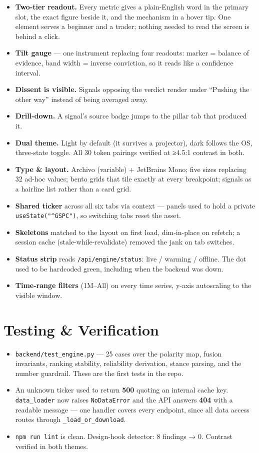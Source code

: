 \documentclass[11pt]{article}
\newcommand{\tk}[1]{\texttt{#1}}
\begin{document}
\begin{itemize}
\item \textbf{Two-tier readout.} Every metric gives a plain-English word in the
primary slot, the exact figure beside it, and the mechanism in a hover tip. One
element serves a beginner and a trader; nothing needed to read the screen is behind a
click.
\item \textbf{Tilt gauge} — one instrument replacing four readouts: marker = balance
of evidence, band width = inverse conviction, so it reads like a confidence interval.
\item \textbf{Dissent is visible.} Signals opposing the verdict render under ``Pushing
the other way'' instead of being averaged away.
\item \textbf{Drill-down.} A signal's source badge jumps to the pillar tab that
produced it.
\item \textbf{Dual theme.} Light by default (it survives a projector), dark follows the
OS, three-state toggle. All 30 token pairings verified at ≥4.5:1 contrast in both.
\item \textbf{Type \& layout.} Archivo (variable) + JetBrains Mono; five sizes
replacing 32 ad-hoc values; bento grids that tile exactly at every breakpoint; signals
as a hairline list rather than a card grid.
\item \textbf{Shared ticker} across all six tabs via context — panels used to hold a
private \tk{useState("\textasciicircum{}GSPC")}, so switching tabs reset the asset.
\item \textbf{Skeletons} matched to the layout on first load, dim-in-place on refetch;
a session cache (stale-while-revalidate) removed the jank on tab switches.
\item \textbf{Status strip} reads \tk{/api/engine/status}: live / warming / offline.
The dot used to be hardcoded green, including when the backend was down.
\item \textbf{Time-range filters} (1M--All) on every time series, y-axis autoscaling to
the visible window.
\end{itemize}

\section{Testing \& Verification}
\begin{itemize}
\item \tk{backend/test\_engine.py} — 25 cases over the polarity map, fusion
invariants, ranking stability, reliability derivation, stance parsing, and the number
guardrail. These are the first tests in the repo.
\item An unknown ticker used to return \textbf{500} quoting an internal cache key.
\tk{data\_loader} now raises \tk{NoDataError} and the API answers \textbf{404} with a
readable message — one handler covers every endpoint, since all data access routes
through \tk{\_load\_or\_download}.
\item \tk{npm run lint} is clean. Design-hook detector: 8 findings → 0. Contrast
verified in both themes.
\end{itemize}
\end{document}
